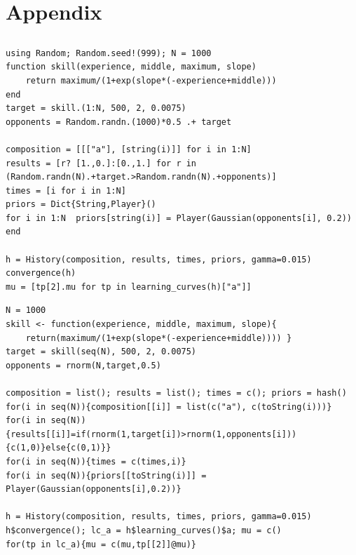 \documentclass[a4paper,10pt]{book}
\theoremstyle{definition}
\newif\ifen
\newif\ifes
\newcommand{\en}[1]{\ifen#1\fi}
\newcommand{\es}[1]{\ifes#1\fi}
\begin{document}
\section{Appendix} \label{app:technical}

\subsection{\en{Skill evolution}}\label{sec:appendix_skill_evolution}

\en{We attach the \texttt{Julia} and \texttt{R} codes that solve the example presented in the section \ref{sec:skill_evolution} about estimation the skill evolution of a new player. }%
\es{Adjuntamos los c\'odigos de \texttt{Julia} y \texttt{R} que resuelven el ejemplo presentado en la secci\'on \ref{sec:skill_evolution} sobre la evoluci\'on de habilidad de un jugador nuevo. }%
%
\begin{lstlisting}[backgroundcolor=\color{julia!60},caption={\en{\texttt{Julia} code}\es{C\'odigo \texttt{Julia}}},aboveskip=0.0 \baselineskip, belowskip=0.1cm]
using Random; Random.seed!(999); N = 1000
function skill(experience, middle, maximum, slope)
    return maximum/(1+exp(slope*(-experience+middle))) 
end
target = skill.(1:N, 500, 2, 0.0075)
opponents = Random.randn.(1000)*0.5 .+ target

composition = [[["a"], [string(i)]] for i in 1:N]
results = [r? [1.,0.]:[0.,1.] for r in (Random.randn(N).+target.>Random.randn(N).+opponents)]
times = [i for i in 1:N]
priors = Dict{String,Player}()
for i in 1:N  priors[string(i)] = Player(Gaussian(opponents[i], 0.2))  end

h = History(composition, results, times, priors, gamma=0.015)
convergence(h)
mu = [tp[2].mu for tp in learning_curves(h)["a"]]
\end{lstlisting}
%
\begin{lstlisting}[backgroundcolor=\color{r!50},caption={\en{\texttt{R} code}\es{C\'odigo \texttt{R}}},aboveskip=0.0 \baselineskip, belowskip=0.1cm]
N = 1000
skill <- function(experience, middle, maximum, slope){
    return(maximum/(1+exp(slope*(-experience+middle)))) }
target = skill(seq(N), 500, 2, 0.0075)
opponents = rnorm(N,target,0.5)

composition = list(); results = list(); times = c(); priors = hash()
for(i in seq(N)){composition[[i]] = list(c("a"), c(toString(i)))}
for(i in seq(N)){results[[i]]=if(rnorm(1,target[i])>rnorm(1,opponents[i])){c(1,0)}else{c(0,1)}}
for(i in seq(N)){times = c(times,i)}
for(i in seq(N)){priors[[toString(i)]] = Player(Gaussian(opponents[i],0.2))}
    
h = History(composition, results, times, priors, gamma=0.015)
h$convergence(); lc_a = h$learning_curves()$a; mu = c()
for(tp in lc_a){mu = c(mu,tp[[2]]@mu)}
\end{lstlisting}
\end{document}
